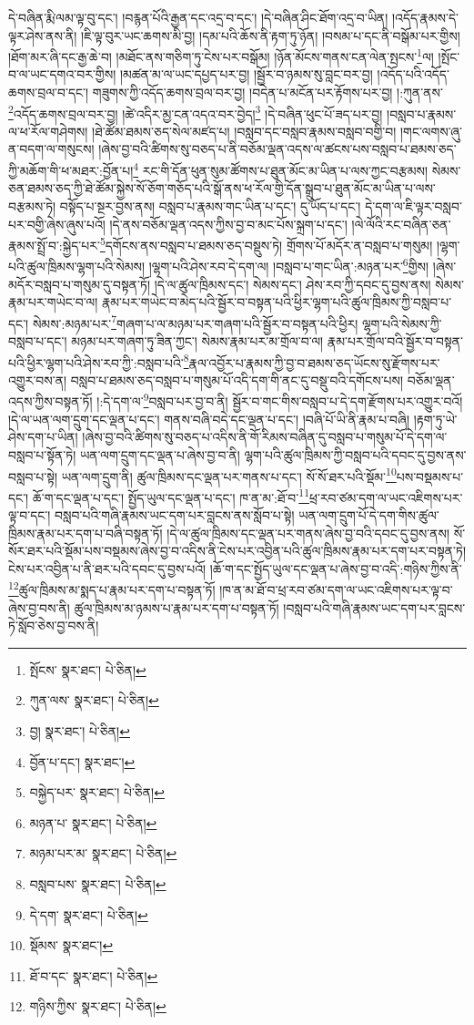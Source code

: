 དེ་བཞིན་རྨི་ལམ་ལྟ་བུ་དང་། །བརྙན་པོའི་རྒྱན་དང་འདྲ་བ་དང་། །དེ་བཞིན་ཤིང་ཐོག་འདྲ་བ་ཡིན། །འདོད་རྣམས་དེ་ལྟར་ཤེས་ནས་ནི། །ཇི་ལྟ་བུར་ཡང་ཆགས་མི་བྱ། །དམ་པའི་ཆོས་ནི་རྟག་ཏུ་ཉོན། །བསམ་པ་དང་ནི་བསྒོམ་པར་གྱིས། །ཐོག་མར་ཞི་དང་རྒྱ་ཆེ་བ། །མཐོང་ནས་གཅིག་ཏུ་ངེས་པར་བསྒོམ། །ཉོན་མོངས་གནས་ངན་ལེན་སྤངས་\footnote{སྤོངས་  སྣར་ཐང་།  པེ་ཅིན། }ལ། །སྤོང་བ་ལ་ཡང་དགའ་བར་གྱིས། །མཚན་མ་ལ་ཡང་དཔྱད་པར་བྱ། །སྦྱོར་བ་ཉམས་སུ་བླང་བར་བྱ། །འདོད་པའི་འདོད་ཆགས་བྲལ་བ་དང་། གཟུགས་ཀྱི་འདོད་ཆགས་བྲལ་བར་བྱ། །བདེན་པ་མངོན་པར་རྟོགས་པར་བྱ། །:ཀུན་ནས་\footnote{ཀུན་ལས་  སྣར་ཐང་།  པེ་ཅིན། }འདོད་ཆགས་བྲལ་བར་བྱ། །ཚེ་འདིར་མྱ་ངན་འདའ་བར་བྱེད།\footnote{བྱ།  སྣར་ཐང་།  པེ་ཅིན། } །དེ་བཞིན་ཕུང་པོ་ཟད་པར་བྱ། །བསླབ་པ་རྣམས་ལ་ཕ་རོལ་གཤེགས། །ཐེ་ཚོམ་ཐམས་ཅད་སེལ་མཛད་པ། །བསླབ་དང་བསླབ་རྣམས་བསླབ་བགྱི་བ། །གང་ལགས་ཞུ་ན་བདག་ལ་གསུངས། །ཞེས་བྱ་བའི་ཚིགས་སུ་བཅད་པ་ནི་བཅོམ་ལྡན་འདས་ལ་ཚངས་པས་བསླབ་པ་ཐམས་ཅད་ཀྱི་མཆོག་གི་ཕ་མཐར་:བྱོན་པ།\footnote{བྱོན་པ་དང་།  སྣར་ཐང་། } རང་གི་དོན་ཕུན་སུམ་ཚོགས་པ་ཐུན་མོང་མ་ཡིན་པ་ལས་ཀྱང་བརྩམས། སེམས་ཅན་ཐམས་ཅད་ཀྱི་ཐེ་ཚོམ་སྐྱེས་སོ་ཅོག་གཅོད་པའི་སྒོ་ནས་ཕ་རོལ་གྱི་དོན་སྒྲུབ་པ་ཐུན་མོང་མ་ཡིན་པ་ལས་བརྩམས་ཏེ། བསྟོད་པ་སྔར་བྱས་ནས། བསླབ་པ་རྣམས་གང་ཡིན་པ་དང་། དུ་ཡོད་པ་དང་། དེ་དག་ལ་ཇི་ལྟར་བསླབ་པར་བགྱི་ཞེས་ཞུས་པའོ། །དེ་ནས་བཅོམ་ལྡན་འདས་ཀྱིས་བྱ་བ་མང་པོས་སྐྲག་པ་དང་། །ལེ་ལོའི་རང་བཞིན་ཅན་རྣམས་སྤྲོ་བ་:སྐྱེད་པར་\footnote{བསྐྱེད་པར་  སྣར་ཐང་།  པེ་ཅིན། }དགོངས་ནས་བསླབ་པ་ཐམས་ཅད་བསྡུས་ཏེ། གྲོགས་པོ་མདོར་ན་བསླབ་པ་གསུམ། །ལྷག་པའི་ཚུལ་ཁྲིམས་ལྷག་པའི་སེམས། །ལྷག་པའི་ཤེས་རབ་དེ་དག་ལ། །བསླབ་པ་གང་ཡིན་:མཉན་པར་\footnote{མཉན་པ་  སྣར་ཐང་།  པེ་ཅིན། }གྱིས། །ཞེས་མདོར་བསླབ་པ་གསུམ་དུ་བསྟན་ཏོ། །དེ་ལ་ཚུལ་ཁྲིམས་དང་། སེམས་དང་། ཤེས་རབ་ཀྱི་དབང་དུ་བྱས་ནས། སེམས་རྣམ་པར་གཡེང་བ་ལ། རྣམ་པར་གཡེང་བ་མེད་པའི་སྦྱོར་བ་བསྟན་པའི་ཕྱིར་ལྷག་པའི་ཚུལ་ཁྲིམས་ཀྱི་བསླབ་པ་དང་། སེམས་:མཉམ་པར་\footnote{མཉམ་པར་མ་  སྣར་ཐང་།  པེ་ཅིན། }གཞག་པ་ལ་མཉམ་པར་གཞག་པའི་སྦྱོར་བ་བསྟན་པའི་ཕྱིར། ལྷག་པའི་སེམས་ཀྱི་བསླབ་པ་དང་། མཉམ་པར་གཞག་ཏུ་ཟིན་ཀྱང་། སེམས་རྣམ་པར་མ་གྲོལ་བ་ལ། རྣམ་པར་གྲོལ་བའི་སྦྱོར་བ་བསྟན་པའི་ཕྱིར་ལྷག་པའི་ཤེས་རབ་ཀྱི་:བསླབ་པའི་\footnote{བསླབ་པས་  སྣར་ཐང་།  པེ་ཅིན། }རྣལ་འབྱོར་པ་རྣམས་ཀྱི་བྱ་བ་ཐམས་ཅད་ཡོངས་སུ་རྫོགས་པར་འགྱུར་བས་ན། བསླབ་པ་ཐམས་ཅད་བསླབ་པ་གསུམ་པོ་འདི་དག་གི་ནང་དུ་བསྡུ་བའི་དགོངས་པས། བཅོམ་ལྡན་འདས་ཀྱིས་བསྟན་ཏོ། །:དེ་དག་ལ་\footnote{དེ་དག་  སྣར་ཐང་།  པེ་ཅིན། }བསླབ་པར་བྱ་བ་ནི། སྦྱོར་བ་གང་གིས་བསླབ་པ་དེ་དག་རྫོགས་པར་འགྱུར་བའོ། །དེ་ལ་ཡན་ལག་དྲུག་དང་ལྡན་པ་དང་། གནས་བཞི་བདེ་དང་ལྡན་པ་དང་། །བཞི་པོ་ཡི་ནི་རྣམ་པ་བཞི། །རྟག་ཏུ་ཡེ་ཤེས་དག་པ་ཡིན། །ཞེས་བྱ་བའི་ཚིགས་སུ་བཅད་པ་འདིས་ནི་གོ་རིམས་བཞིན་དུ་བསླབ་པ་གསུམ་པོ་དེ་དག་ལ་བསླབ་པ་སྟོན་ཏེ། ཡན་ལག་དྲུག་དང་ལྡན་པ་ཞེས་བྱ་བ་ནི། ལྷག་པའི་ཚུལ་ཁྲིམས་ཀྱི་བསླབ་པའི་དབང་དུ་བྱས་ནས་བསླབ་པ་སྟེ། ཡན་ལག་དྲུག་ནི། ཚུལ་ཁྲིམས་དང་ལྡན་པར་གནས་པ་དང་། སོ་སོ་ཐར་པའི་སྡོམ་\footnote{སྡོམས་  སྣར་ཐང་། }པས་བསྡམས་པ་དང་། ཆོ་ག་དང་ལྡན་པ་དང་། སྤྱོད་ཡུལ་དང་ལྡན་པ་དང་། ཁ་ན་མ་:ཐོ་བ་\footnote{ཐོ་བ་དང་  སྣར་ཐང་།  པེ་ཅིན། }ཕྲ་རབ་ཙམ་དག་ལ་ཡང་འཇིགས་པར་ལྟ་བ་དང་། བསླབ་པའི་གཞི་རྣམས་ཡང་དག་པར་བླངས་ནས་སློབ་པ་སྟེ། ཡན་ལག་དྲུག་པོ་དེ་དག་གིས་ཚུལ་ཁྲིམས་རྣམ་པར་དག་པ་བཞི་བསྟན་ཏོ། །དེ་ལ་ཚུལ་ཁྲིམས་དང་ལྡན་པར་གནས་ཞེས་བྱ་བའི་དབང་དུ་བྱས་ནས། སོ་སོར་ཐར་པའི་སྡོམ་པས་བསྡམས་ཞེས་བྱ་བ་འདིས་ནི་ངེས་པར་འབྱིན་པའི་ཚུལ་ཁྲིམས་རྣམ་པར་དག་པར་བསྟན་ཏེ། ངེས་པར་འབྱིན་པ་ནི་ཐར་པའི་དབང་དུ་བྱས་པའོ། །ཆོ་ག་དང་སྤྱོད་ཡུལ་དང་ལྡན་པ་ཞེས་བྱ་བ་འདི་:གཉིས་ཀྱིས་ནི་\footnote{གཉིས་ཀྱིས་  སྣར་ཐང་།  པེ་ཅིན། }ཚུལ་ཁྲིམས་མ་སྨད་པ་རྣམ་པར་དག་པ་བསྟན་ཏོ། །ཁ་ན་མ་ཐོ་བ་ཕྲ་རབ་ཙམ་དག་ལ་ཡང་འཇིགས་པར་ལྟ་བ་ཞེས་བྱ་བས་ནི། ཚུལ་ཁྲིམས་མ་ཉམས་པ་རྣམ་པར་དག་པ་བསྟན་ཏོ། །བསླབ་པའི་གཞི་རྣམས་ཡང་དག་པར་བླངས་ཏེ་སློབ་ཅེས་བྱ་བས་ནི། 